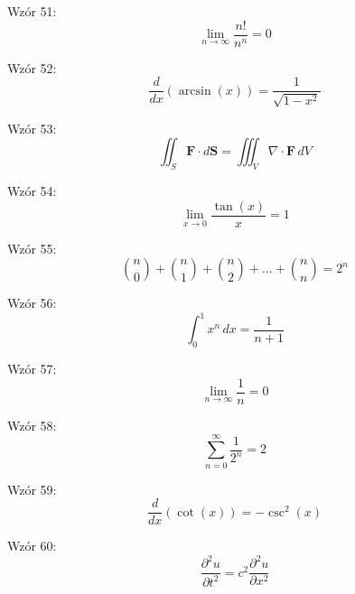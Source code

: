 \documentclass{article}
\begin{document}
Wzór 51:
\[ \lim_{{n \to \infty}} \frac{n!}{n^n} = 0 \]

Wzór 52:
\[ \frac{d}{dx}\left(\arcsin(x)\right) = \frac{1}{\sqrt{1-x^2}} \]

Wzór 53:
\[ \iint_S \mathbf{F} \cdot d\mathbf{S} = \iiint_V \nabla \cdot \mathbf{F} \,dV \]

Wzór 54:
\[ \lim_{{x \to 0}} \frac{\tan(x)}{x} = 1 \]

Wzór 55:
\[ \binom{n}{0} + \binom{n}{1} + \binom{n}{2} + \ldots + \binom{n}{n} = 2^n \]

Wzór 56:
\[ \int_{0}^{1} x^n \,dx = \frac{1}{n+1} \]

Wzór 57:
\[ \lim_{{n \to \infty}} \frac{1}{n} = 0 \]

Wzór 58:
\[ \sum_{n=0}^{\infty} \frac{1}{2^n} = 2 \]

Wzór 59:
\[ \frac{d}{dx}\left(\cot(x)\right) = -\csc^2(x) \]

Wzór 60:
\[ \frac{\partial^2u}{\partial t^2} = c^2 \frac{\partial^2u}{\partial x^2} \]
\end{document}
